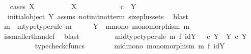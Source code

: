 \begin{isabellebody}
\ \ \isamarkupfalse%
{\isacharparenleft}{\kern0pt}cases\ {\isachardoublequoteopen}X\ {\isasymcong}\ {\isasymOmega}{\isachardoublequoteclose}{\isacharparenright}{\kern0pt}\isanewline
\ \ \ \ \ \ \isamarkupfalse%
\ {\isachardoublequoteopen}X\ {\isasymcong}\ {\isasymOmega}{\isachardoublequoteclose}\isanewline
\ \ \ \ \ \ \isamarkupfalse%
\ {\isachardoublequoteopen}{\isasymOmega}\ \ {\isasymle}\isactrlsub c\ \ Y{\isachardoublequoteclose}\isanewline
\ \ \ \ \ \ \ \ \ \isamarkupfalse%
\ {\isacartoucheopen}{\isasymnot}\ initial{\isacharunderscore}{\kern0pt}object\ Y{\isacartoucheclose}\ assms\ not{\isacharunderscore}{\kern0pt}init{\isacharunderscore}{\kern0pt}not{\isacharunderscore}{\kern0pt}term\ size{\isacharunderscore}{\kern0pt}{}plus{\isacharunderscore}{\kern0pt}sets\ \isamarkupfalse%
\ blast\isanewline
\ \ \ \ \ \ \isamarkupfalse%
\ \isamarkupfalse%
\ m\ \ m{\isacharunderscore}{\kern0pt}type{\isacharbrackleft}{\kern0pt}type{\isacharunderscore}{\kern0pt}rule{\isacharbrackright}{\kern0pt}{\isacharcolon}{\kern0pt}\ {\isachardoublequoteopen}m\ {\isacharcolon}{\kern0pt}\ {\isasymOmega}\ \ {\isasymrightarrow}\ \ Y{\isachardoublequoteclose}\ \ m{\isacharunderscore}{\kern0pt}mono{\isacharcolon}{\kern0pt}\ {\isachardoublequoteopen}monomorphism\ m{\isachardoublequoteclose}\isanewline
\ \ \ \ \ \ \ \ \isamarkupfalse%
\ is{\isacharunderscore}{\kern0pt}smaller{\isacharunderscore}{\kern0pt}than{\isacharunderscore}{\kern0pt}def\ \isamarkupfalse%
\ blast\isanewline
\ \ \ \ \ \ \isamarkupfalse%
\ \isamarkupfalse%
\ m{\isacharunderscore}{\kern0pt}id{\isacharunderscore}{\kern0pt}type{\isacharbrackleft}{\kern0pt}type{\isacharunderscore}{\kern0pt}rule{\isacharbrackright}{\kern0pt}{\isacharcolon}{\kern0pt}\ {\isachardoublequoteopen}m\ {\isasymtimes}\isactrlsub f\ id{\isacharparenleft}{\kern0pt}Y{\isacharparenright}{\kern0pt}\ {\isacharcolon}{\kern0pt}\ {\isasymOmega}\ {\isasymtimes}\isactrlsub c\ Y\ {\isasymrightarrow}\ Y\ {\isasymtimes}\isactrlsub c\ Y{\isachardoublequoteclose}\isanewline
\ \ \ \ \ \ \ \ \isamarkupfalse%
\ typecheck{\isacharunderscore}{\kern0pt}cfuncs\isanewline
\ \ \ \ \ \ \isamarkupfalse%
\ m{\isacharunderscore}{\kern0pt}id{\isacharunderscore}{\kern0pt}mono{\isacharcolon}{\kern0pt}\ {\isachardoublequoteopen}monomorphism\ {\isacharparenleft}{\kern0pt}m\ {\isasymtimes}\isactrlsub f\ id{\isacharparenleft}{\kern0pt}Y{\isacharparenright}{\kern0pt}{\isacharparenright}{\kern0pt}{\isachardoublequoteclose}\isanewline

\end{isabellebody}
